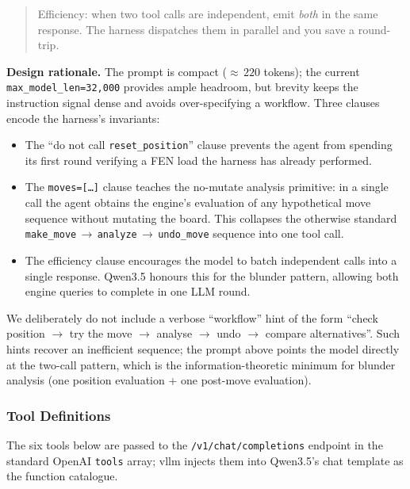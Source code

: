 \begin{tcolorbox}[promptbox,
  title={$\triangleright$\; System Prompt --- Chess Analyst},
  label={box:sysprompt}]
\begin{quote}
\smallskip
Efficiency: when two tool calls are independent, emit \emph{both} in
the same response.  The harness dispatches them in parallel and you
save a round-trip.
\end{quote}

\smallskip
\noindent\textbf{Design rationale.}  The prompt is compact
(${\approx}\,220$ tokens); the current \texttt{max\_model\_len=32{,}000}
provides ample headroom, but brevity keeps the instruction signal dense
and avoids over-specifying a workflow.  Three clauses encode the harness's
invariants:

\begin{itemize}[noitemsep, topsep=2pt, leftmargin=14pt]
  \item The ``do not call \texttt{reset\_position}'' clause prevents
        the agent from spending its first round verifying a FEN load
        the harness has already performed.
  \item The \texttt{moves=[\ldots]} clause teaches the no-mutate
        analysis primitive: in a single call the agent obtains the
        engine's evaluation of any hypothetical move sequence without
        mutating the board.  This collapses the otherwise standard
        \texttt{make\_move}\,$\to$\,\texttt{analyze}\,$\to$\,\texttt{undo\_move}
        sequence into one tool call.
  \item The efficiency clause encourages the model to batch
        independent calls into a single response.  Qwen3.5 honours
        this for the blunder pattern, allowing both engine queries to
        complete in one LLM round.
\end{itemize}

\noindent We deliberately do not include a verbose ``workflow'' hint of
the form ``check position $\to$ try the move $\to$ analyse
$\to$ undo $\to$ compare alternatives''.  Such hints recover an
inefficient sequence; the prompt above points the model directly at
the two-call pattern, which is the information-theoretic minimum for
blunder analysis (one position evaluation + one post-move evaluation).
\end{tcolorbox}

\subsubsection{Tool Definitions}
\label{app:details:agent:tools}

The six tools below are passed to the \texttt{/v1/chat/completions} endpoint in
the standard OpenAI \texttt{tools} array; vllm injects them into Qwen3.5's
chat template as the function catalogue.

